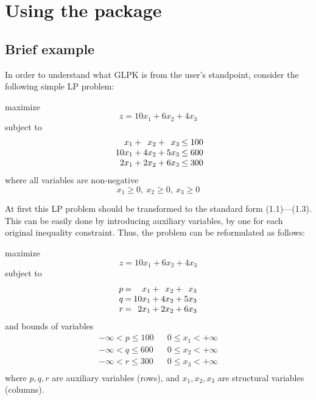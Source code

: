 \section{Using the package}

\subsection{Brief example}

In order to understand what GLPK is from the user's standpoint,
consider the following simple LP problem:

\medskip

\noindent
\hspace{.5in} maximize
$$z = 10 x_1 + 6 x_2 + 4 x_3$$
\hspace{.5in} subject to
$$
\begin{array}{r@{\:}c@{\:}r@{\:}c@{\:}r@{\:}c@{\:}r}
x_1 &+&x_2 &+&x_3 &\leq 100 \\
10 x_1 &+& 4 x_2 & +&5 x_3 & \leq 600 \\
2 x_1 &+& 2 x_2 & +& 6 x_3 & \leq 300 \\
\end{array}
$$
\hspace{.5in} where all variables are non-negative
$$x_1 \geq 0, \ x_2 \geq 0, \ x_3 \geq 0$$

At first this LP problem should be transformed to the standard form
(1.1)---(1.3). This can be easily done by introducing auxiliary
variables, by one for each original inequality constraint. Thus, the
problem can be reformulated as follows:

\medskip

\noindent
\hspace{.5in} maximize
$$z = 10 x_1 + 6 x_2 + 4 x_3$$
\hspace{.5in} subject to
$$
\begin{array}{r@{\:}c@{\:}r@{\:}c@{\:}r@{\:}c@{\:}r}
p& = &x_1 &+&x_2 &+&x_3 \\
q& = &10 x_1 &+& 4 x_2 &+& 5 x_3 \\
r& = &2  x_1 &+& 2 x_2 &+& 6 x_3 \\
\end{array}
$$
\hspace{.5in} and bounds of variables
$$
\begin{array}{ccc}
\nonumber -\infty < p \leq 100 && 0 \leq x_1 < +\infty \\
\nonumber -\infty < q \leq 600 && 0 \leq x_2 < +\infty \\
\nonumber -\infty < r \leq 300 && 0 \leq x_3 < +\infty \\
\end{array}
$$
where $p, q, r$ are auxiliary variables (rows), and $x_1, x_2, x_3$ are
structural variables (columns).

